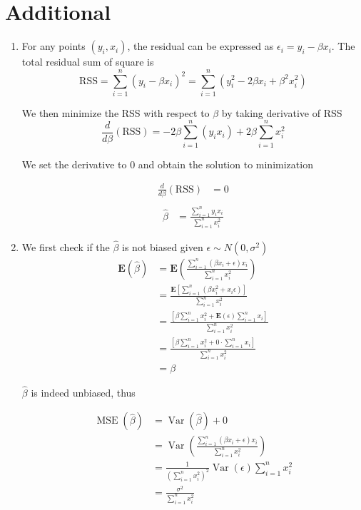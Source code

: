 \documentclass{article}
\newcommand{\E}{\mathbf{E}}
\DeclareMathOperator{\Var}{Var}
\DeclareMathOperator{\MSE}{MSE}
\begin{document}
\section*{Additional}
\begin{enumerate}[label=(\alph*)]

  \item
        For any points \((y_i, x_i)\), the residual can be expressed as \(\epsilon_i = y_i - \beta x_i\). The total residual sum of square is
        \[\text{RSS} = \sum_{i=1}^{n} (y_i - \beta x_i)^2 = \sum_{i=1}^{n} (y_i^2 - 2\beta x_i + \beta^2 x_i^2)\]

        We then minimize the RSS with respect to \(\beta\) by taking derivative of RSS
        \[
          \frac{d}{d\beta}(\text{RSS}) =  -2\beta\sum_{i=1}^{n} (y_ix_i) + 2\beta \sum_{i=1}^{n} x_i^2
        \]

        We set the derivative to 0 and obtain the solution to minimization

        \begin{align*}
          \frac{d}{d\beta}(\text{RSS}) & = 0 \\
        \end{align*}
        \begin{align*}
          \hat \beta & = \frac{\sum_{i=1}^{n} y_i x_i}{\sum_{i=1}^{n} x_i^2}
        \end{align*}

  \item

        We first check if the \(\hat \beta\) is not biased given \(\epsilon \sim N(0, \sigma^2)\)
        \begin{align*}
          \E(\hat \beta) & = \E(\frac{\sum_{i=1}^{n} (\beta x_i + \epsilon) x_i}{\sum_{i=1}^{n} x_i^2})                 \\
                         & = \frac{\E[\sum_{i=1}^{n} (\beta x_i^2 + x_i\epsilon)]}{\sum_{i=1}^{n} x_i^2}                \\
                         & = \frac{[\beta \sum_{i=1}^{n} x_i^2 + \E(\epsilon)\sum_{i=1}^{n} x_i]}{\sum_{i=1}^{n} x_i^2} \\
                         & = \frac{[\beta \sum_{i=1}^{n} x_i^2 + 0\cdot\sum_{i=1}^{n} x_i]}{\sum_{i=1}^{n} x_i^2}       \\
                         & = \beta
        \end{align*}

        \(\hat \beta\) is indeed unbiased, thus

        \begin{align*}
          \MSE(\hat \beta) & =  \Var(\hat \beta) + 0                                                        \\
                           & = \Var(\frac{\sum_{i=1}^{n} (\beta x_i + \epsilon) x_i}{\sum_{i=1}^{n} x_i^2}) \\
                           & = \frac{1}{(\sum_{i=1}^{n} x_i^2)^2} \Var(\epsilon) \sum_{i=1}^{n} x_i^2       \\
                           & = \frac{\sigma^2}{\sum_{i=1}^{n}x_i^2}
        \end{align*}


\end{enumerate}
\end{document}
